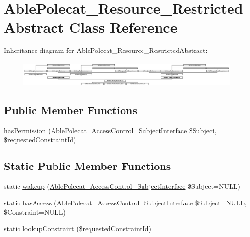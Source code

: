 \hypertarget{class_able_polecat___resource___restricted_abstract}{}\section{Able\+Polecat\+\_\+\+Resource\+\_\+\+Restricted\+Abstract Class Reference}
\label{class_able_polecat___resource___restricted_abstract}
Inheritance diagram for Able\+Polecat\+\_\+\+Resource\+\_\+\+Restricted\+Abstract\+:\begin{figure}[H]
\begin{center}
\leavevmode
\includegraphics[height=1.327913cm]{class_able_polecat___resource___restricted_abstract}
\end{center}
\end{figure}
\subsection*{Public Member Functions}
\begin{DoxyCompactItemize}
\item 
\hyperlink{class_able_polecat___resource___restricted_abstract_a645291218d5ad4046d1367bb9718867f}{has\+Permission} (\hyperlink{interface_able_polecat___access_control___subject_interface}{Able\+Polecat\+\_\+\+Access\+Control\+\_\+\+Subject\+Interface} \$Subject, \$requested\+Constraint\+Id)
\end{DoxyCompactItemize}
\subsection*{Static Public Member Functions}
\begin{DoxyCompactItemize}
\item 
static \hyperlink{class_able_polecat___resource___restricted_abstract_a3f2135f6ad45f51d075657f6d20db2cd}{wakeup} (\hyperlink{interface_able_polecat___access_control___subject_interface}{Able\+Polecat\+\_\+\+Access\+Control\+\_\+\+Subject\+Interface} \$Subject=N\+U\+L\+L)
\item 
static \hyperlink{class_able_polecat___resource___restricted_abstract_a5bdabdf819eef8c6337a4da78b55dc39}{has\+Access} (\hyperlink{interface_able_polecat___access_control___subject_interface}{Able\+Polecat\+\_\+\+Access\+Control\+\_\+\+Subject\+Interface} \$Subject=N\+U\+L\+L, \$Constraint=N\+U\+L\+L)
\item 
static \hyperlink{class_able_polecat___resource___restricted_abstract_a46d5b25cc8f9b1ad658b5c6617536824}{lookup\+Constraint} (\$requested\+Constraint\+Id)
\end{DoxyCompactItemize}
